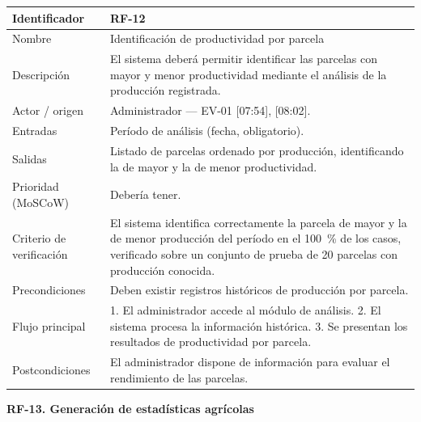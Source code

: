\documentclass[12pt,a4paper]{article}
\begin{document}
\begin{center}
\begin{longtable}{|p{3.5cm}|p{10.7cm}|}
\hline
Identificador & RF-12 \\
\hline
Nombre & Identificación de productividad por parcela \\
\hline
Descripción & El sistema deberá permitir identificar las parcelas con mayor y menor productividad mediante el análisis de la producción registrada. \\
\hline
Actor / origen & Administrador --- EV-01 [07:54], [08:02]. \\
\hline
Entradas & Período de análisis (fecha, obligatorio). \\
\hline
Salidas & Listado de parcelas ordenado por producción, identificando la de mayor y la de menor productividad. \\
\hline
Prioridad (MoSCoW) & Debería tener. \\
\hline
Criterio de verificación & El sistema identifica correctamente la parcela de mayor y la de menor producción del período en el 100~\% de los casos, verificado sobre un conjunto de prueba de 20 parcelas con producción conocida. \\
\hline
Precondiciones & Deben existir registros históricos de producción por parcela. \\
\hline
Flujo principal & 1. El administrador accede al módulo de análisis. 2. El sistema procesa la información histórica. 3. Se presentan los resultados de productividad por parcela. \\
\hline
Postcondiciones & El administrador dispone de información para evaluar el rendimiento de las parcelas. \\
\hline
\end{longtable}
\end{center}

\bigskip
\noindent\textbf{RF-13. Generación de estadísticas agrícolas}
\label{tab:RF-13}
\end{document}
